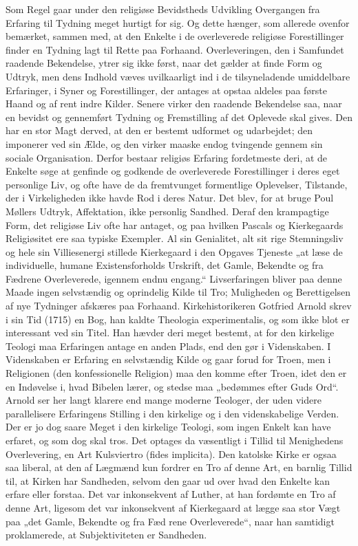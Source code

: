 \documentclass[12pt,a4paper]{article}
\newcommand{\opage}[1]{\marginnote{\footnotesize\textit{[#1]}}}
\begin{document}
Som Regel gaar under den religiøse Bevidstheds Udvikling Overgangen fra Erfaring
til Tydning meget hurtigt for sig. Og dette hænger, som allerede ovenfor
bemærket, sammen med, at den Enkelte i de overleverede religiøse Forestillinger
finder en Tydning lagt til Rette paa Forhaand. Overleveringen, den i Samfundet
raadende Bekendelse, ytrer sig ikke først, naar det gælder at finde Form og
Udtryk, men dens Indhold væves uvilkaarligt ind i de tilsyneladende umiddelbare
Erfaringer, i Syner og Forestillinger, der antages at opstaa aldeles paa første
Haand og af rent indre Kilder. Senere virker den raadende Bekendelse saa, naar
en bevidst og gennemført Tydning og Fremstilling af det Oplevede skal gives. Den
har en stor Magt derved, at den er bestemt udformet og udarbejdet; den imponerer
ved sin Ælde, og den virker maaske endog tvingende gennem sin sociale
Organisation. Derfor bestaar religiøs Erfaring fordetmeste deri, at de Enkelte
søge at genfinde og godkende de overleverede Forestillinger i deres eget
personlige Liv, og ofte have de da fremtvunget formentlige \opage{52} Oplevelser, Tilstande,
der i Virkeligheden ikke havde Rod i deres Natur. Det blev, for at bruge Poul
Møllers Udtryk, Affektation, ikke personlig Sandhed. Deraf den krampagtige Form,
det religiøse Liv ofte har antaget, og paa hvilken Pascals og Kierkegaards
Religiøsitet ere saa typiske Exempler. Al sin Genialitet, alt sit rige
Stemningsliv og hele sin Villiesenergi stillede Kierkegaard i den Opgaves
Tjeneste „at læse de individuelle, humane Existensforholds Urskrift, det Gamle,
Bekendte og fra Fædrene Overleverede, igennem endnu engang.“ Livserfaringen
bliver paa denne Maade ingen selvstændig og oprindelig Kilde til Tro; Muligheden
og Berettigelsen af nye Tydninger afskæres paa Forhaand. Kirkehistorikeren
Gotfried Arnold skrev i sin Tid (1715) en Bog, han kaldte Theologia
experimentalis, og som ikke blot er interessant ved sin Titel. Han hævder deri
meget bestemt, at for den kirkelige Teologi maa Erfaringen antage en anden
Plads, end den gør i Videnskaben. I Videnskaben er Erfaring en selvstændig Kilde
og gaar forud for Troen, men i Religionen (den konfessionelle Religion) maa den
komme efter Troen, idet den er en Indøvelse i, hvad Bibelen lærer, og stedse maa
„bedømmes efter Guds Ord“. Arnold ser her langt klarere end mange moderne
Teologer, der uden videre parallelisere Erfaringens Stilling i den kirkelige og
i den videnskabelige Verden. Der er jo dog saare Meget i den kirkelige Teologi,
som ingen Enkelt kan have erfaret, og som dog skal tros. Det optages da
væsentligt i Tillid til Menighedens Overlevering, en Art Kulsviertro (fides
implicita). Den katolske Kirke er ogsaa saa liberal, at den af Lægmænd kun
fordrer en Tro af denne Art, en barnlig Tillid til, at Kirken har Sandheden,
selvom den gaar ud over hvad den Enkelte kan erfare eller forstaa. Det var
inkonsekvent af Luther, at han fordømte en Tro af denne Art, ligesom det var
inkonsekvent af Kierkegaard at lægge saa stor Vægt paa „det Gamle, Bekendte og
fra Fæd%
\opage{53}rene Overleverede“, naar han samtidigt proklamerede, at Subjektiviteten er
Sandheden.
\end{document}
